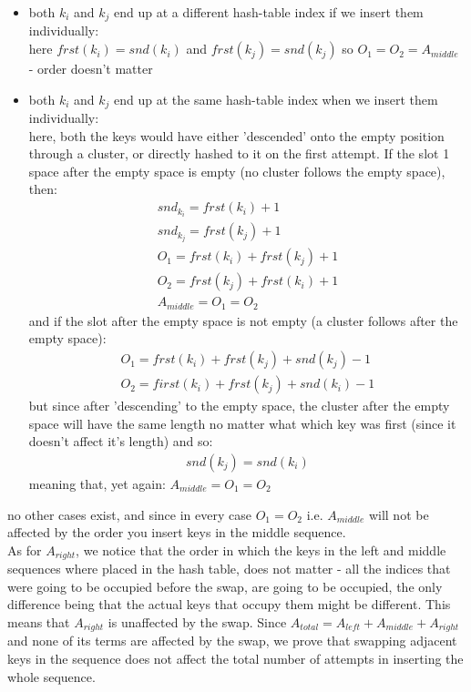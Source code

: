 \documentclass{report}
\begin{document}
\begin{itemize}
    \item both $k_{i}$ and $k_{j}$ end up at a different hash-table index if we insert them individually:\\ here $frst(k_{i}) = snd(k_{i})$ and $frst(k_{j}) = snd(k_{j})$ so $O_{1} = O_{2} = A_{middle}$ - order doesn't matter
    \item both $k_{i}$ and $k_{j}$ end up at the same hash-table index when we insert them individually:\\
    here, both the keys would have either 'descended' onto the empty position through a cluster, or directly hashed to it on the first attempt. If the slot 1 space after the empty space is empty (no cluster follows the empty space), then:
    \begin{gather}
      snd_{k_{i}} = frst(k_{i}) + 1\\
      snd_{k_{j}} = frst(k_{j}) + 1\\
      O_{1} = frst(k_{i}) + frst(k_{j}) + 1\\
      O_{2} = frst(k_{j}) + frst(k_{i}) + 1\\
      A_{middle} = O_{1} = O_{2}
    \end{gather}
    and if the slot after the empty space is not empty (a cluster follows after the empty space):
    \begin{gather}
        O_{1} = frst(k_{i}) + frst(k_{j}) + snd(k_{j}) - 1\\
        O_{2} = first(k_{i}) + frst(k_{j}) + snd(k_{i}) - 1
    \end{gather}
    but since after 'descending' to the empty space, the cluster after the empty space will have the same length no matter what which key was first (since it doesn't affect it's length) and so:
    \begin{gather*}
        snd(k_{j}) = snd(k_{i})
    \end{gather*}
    meaning that, yet again: $A_{middle} = O_{1} = O_{2}$
\end{itemize}
no other cases exist, and since in every case $O_{1} = O_{2}$ i.e. $A_{middle}$ will not be affected by the order you insert keys in the middle sequence.\\

As for $A_{right}$, we notice that the order in which the keys in the left and middle sequences where placed in the hash table, does not matter - all the indices that were going to be occupied before the swap, are going to be occupied, the only difference being that the actual keys that occupy them might be different. This means that $A_{right}$ is unaffected by the swap. Since $A_{total} = A_{left} + A_{middle} + A_{right}$ and none of its terms are affected by the swap, we prove that swapping adjacent keys in the sequence does not affect the total number of attempts in inserting the whole sequence.\\
\end{document}
